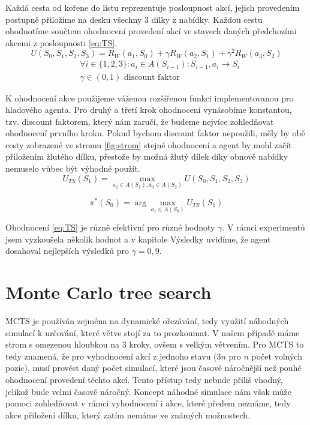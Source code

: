 Každá cesta od kořene do listu reprezentuje posloupnost akcí, jejich provedením postupně přiložíme na desku všechny 3 dílky z nabídky. Každou cestu ohodnotíme součtem ohodnocení provedení akcí ve stavech daných předchozími akcemi z posloupnosti \ref{eq:TS}. 
\begin{equation}
    U(S_0,S_1,S_2,S_3) = R_W(a_1,S_0) + \gamma R_W(a_2,S_1) + \gamma^2 R_W(a_3,S_2) \label{eq:TS}
\end{equation}
\begin{align*}
    &\forall i \in \{1,2,3\}: a_i \in A(S_{i-1}): S_{i-1},a_i \rightarrow S_i\\
    &\gamma\in(0,1) \text{ discount faktor}
\end{align*}

K ohodnocení akce použijeme váženou rozšířenou funkci implementovanou pro hladového agenta. Pro druhý a třetí krok ohodnocení vynásobíme konstantou, tzv. discount faktorem, který nám zaručí, že budeme nejvíce zohledňovat ohodnocení prvního kroku. Pokud bychom discount faktor nepoužili, měly by obě cesty zobrazené ve stromu \ref{fig:strom} stejné ohodnocení a agent by mohl začít přiložením žlutého dílku, přestože by možná žlutý dílek díky obnově nabídky nemuselo vůbec být výhodné použít.
\begin{equation}
    U_{TS}(S_1) = \max_{a_2\in A(S_1), a_3 \in A(S_2)} U(S_0,S_1,S_2,S_3)
\end{equation}

\begin{equation}
    \pi^*(S_0) = \arg\max_{a_1\in A(S_0)} U_{TS}(S_1)
\end{equation}

Ohodnocení \ref{eq:TS} je různě efektivní pro různé hodnoty $\gamma$. V rámci experimentů jsem vyzkoušela několik hodnot a v kapitole Výsledky uvidíme, že agent dosahoval nejlepších výsledků pro $\gamma = 0,9$.


\section{Monte Carlo tree search}

MCTS je používán zejména na dynamické ořezávání, tedy využití náhodných simulací k určování, které větve stojí za to prozkoumat. V našem případě máme strom s omezenou hloubkou na 3 kroky, ovšem s velkým větvením. Pro MCTS to tedy znamená, že pro vyhodnocení akcí z jednoho stavu ($3n$ pro $n$ počet volných pozic), musí provést daný počet simulací, které jsou časově náročnější než pouhé ohodnocení provedení těchto akcí. Tento přístup tedy nebude příliš vhodný, jelikož bude velmi časově náročný. Koncept náhodné simulace nám však může pomoci zohledňovat v rámci vyhodnocení i akce, které předem neznáme, tedy akce přiložení dílku, který zatím nemáme ve známých možnostech.

